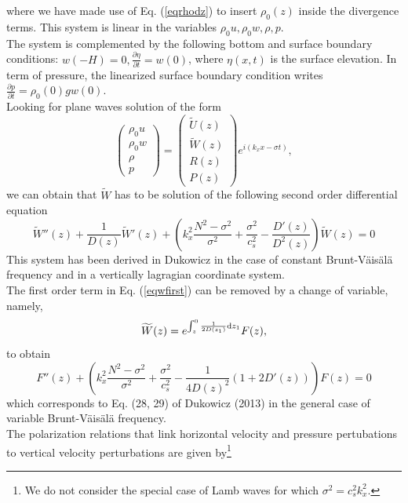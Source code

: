where we have made use of Eq. (\ref{eqrhodz}) to insert $\rho_0(z)$ inside the divergence terms. This system is linear in the variables $\rho_0u, \rho_0w, \rho, p$.\\
The system is complemented by the following bottom and surface boundary conditions: $w(-H)=0, \displaystyle \frac{\partial \eta}{\partial t}=w(0)$, where $\eta(x,t)$ is the surface elevation. In term of pressure, the linearized surface boundary condition writes $\displaystyle \frac{\partial p}{\partial t}=\rho_0(0)gw(0)$.
\\
Looking for plane waves solution of the form
\[
\left(
\begin{array}{c}
\rho_0 u\\
\rho_0 w\\
\rho\\
p
\end{array}
\right)
=
\left(
\begin{array}{c}
\widetilde{U}(z)\\
\widetilde{W}(z)\\
R(z)\\
P(z)
\end{array}
\right)
e^{i(k_xx-\sigma t)},
\]
we can obtain that $\widetilde{W}$ has to be solution of the following second order differential equation
\begin{equation}
\widetilde{W}''(z)+\frac{1}{D(z)}\widetilde{W}'(z)
+
\left(
k_x^2\frac{N^2-\sigma^2}{\sigma^2}+\frac{\sigma^2}{c_s^2}
-\frac{D'(z)}{D^2(z)}
\right)
\widetilde{W}(z)=0
\label{eqwfirst}
\end{equation}
This system has been derived in Dukowicz in the case of constant Brunt-V\"ais\"al\"a frequency and in a vertically lagragian coordinate system.\\
The first order term in Eq. (\ref{eqwfirst}) can be removed by a change of variable, namely,
\[
\widetilde{W}(z)=e^{\int_{z}^0\frac{1}{2D(z_1)}{\rm d}z_1}F(z),
\]
to obtain
\begin{equation}
F''(z)
+\left(
k_x^2\frac{N^2-\sigma^2}{\sigma^2}
+
\frac{\sigma^2}{c_s^2}-\frac{1}{4D(z)^2}(1+2D'(z))
\right)
F(z)=0
\label{eqF}
\end{equation}
which corresponds to Eq. (28, 29) of Dukowicz (2013) in the general case of variable Brunt-V\"ais\"al\"a frequency.
\\
The polarization relations that link horizontal velocity and pressure pertubations to vertical velocity perturbations are given by\footnote{We do not consider the special case of Lamb waves for which $\sigma^2=c_s^2k_x^2$.}
